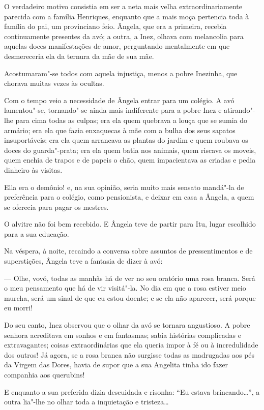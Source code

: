 O verdadeiro motivo consistia em ser a neta mais velha
extraordinariamente parecida com a família Henriques, enquanto que a
mais moça pertencia toda à família do pai, um provinciano feio. Ângela,
que era a primeira, recebia continuamente presentes da avó; a outra, a
Inez, olhava com melancolia para aquelas doces manifestações de amor,
perguntando mentalmente em que desmereceria ela da ternura da mãe de sua
mãe.

Acostumaram"-se todos com aquela injustiça, menos a pobre Inezinha, que
chorava muitas vezes às ocultas.

Com o tempo veio a necessidade de Ângela entrar para um colégio. A avó
lamentou"-se, tornando"-se ainda mais indiferente para a pobre Inez e
atirando"-lhe para cima todas as culpas; era ela quem quebrava a louça
que se sumia do armário; era ela que fazia enxaquecas à mãe com a bulha
dos seus sapatos insuportáveis; era ela quem arrancava as plantas do
jardim e quem roubava os doces do guarda"-prata; era ela quem batia nos
animais, quem riscava os moveis, quem enchia de trapos e de papeis o
chão, quem impacientava as criadas e pedia dinheiro às visitas.

Ella era o demônio! e, na sua opinião, seria muito mais sensato mandá"-la
de preferência para o colégio, como pensionista, e deixar em casa a
Ângela, a quem se oferecia para pagar os mestres.

O alvitre não foi bem recebido. E Ângela teve de partir para Itu, lugar
escolhido para a sua educação.

Na véspera, à noite, recaindo a conversa sobre assuntos de
pressentimentos e de superstições, Ângela teve a fantasia de dizer à
avó:

--- Olhe, vovó, todas as manhãs há de ver no seu oratório uma rosa
branca. Será o meu pensamento que há de vir visitá"-la. No dia em que a
rosa estiver meio murcha, será um sinal de que eu estou doente; e se ela
não aparecer, será porque eu morri!

Do seu canto, Inez observou que o olhar da avó se tornara angustioso. A
pobre senhora acreditava em sonhos e em fantasmas; sabia histórias
complicadas e extravagantes; coisas extraordinárias que ela queria impor
à fé ou à incredulidade dos outros! Já agora, se a rosa branca não
surgisse todas as madrugadas aos pés da Virgem das Dores, havia de supor
que a sua Angelita tinha ido fazer companhia aos querubins!

E enquanto a sua preferida dizia descuidada e risonha: ``Eu estava
brincando\ldots{}'', a outra lia"-lhe no olhar toda a inquietação e
tristeza\ldots{}

